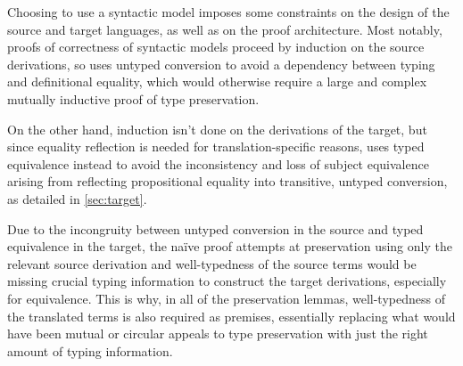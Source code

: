 Choosing to use a syntactic model imposes some constraints on the design
of the source and target languages, as well as on the proof architecture.
Most notably, proofs of correctness of syntactic models proceed
by induction on the source derivations,
so \lang uses untyped conversion to avoid a dependency between typing and definitional equality,
which would otherwise require a large and complex mutually inductive proof of type preservation.

\iffalse
Strictly speaking, such a proof would still be possible,
since the compositionality lemmas are merely up to syntactic equality.
If they were instead up to typed equivalence
(as is the case for the translations in \citet{wjb}),
then the base cases would fail:
to show
$\defeq{\compile{\Phi}, \compile{\Gamma}}{\yT}{\yT}{\compile{\tau}}$
via \rref{equiv-refl} for instance,
$\type{\compile{\Phi}, \compile{\Gamma}}{\yT}{\compile{\tau}}$
would be required,
but this can't be constructed even from
$\type{\Phi; \Gamma}{y}{\tau}$
as it's not a premise and therefore the mutual type preservation induction hypothesis can't be applied.
Still, I use untyped conversion to avoid any other potential complications with the mutual induction.
\fi

On the other hand, induction isn't done on the derivations of the target,
but since equality reflection is needed for translation-specific reasons,
\CICE uses typed equivalence instead to avoid the inconsistency and loss of subject equivalence
arising from reflecting propositional equality into transitive, untyped conversion,
as detailed in \cref{sec:target}.

Due to the incongruity between untyped conversion in the source and typed equivalence in the target,
the na\"ive proof attempts at preservation using only the relevant source derivation
and well-typedness of the source terms would be missing crucial typing information
to construct the target derivations, especially for equivalence.
This is why, in all of the preservation lemmas, well-typedness of the translated terms
is also required as premises, essentially replacing what would have been mutual or circular appeals
to type preservation with just the right amount of typing information.

